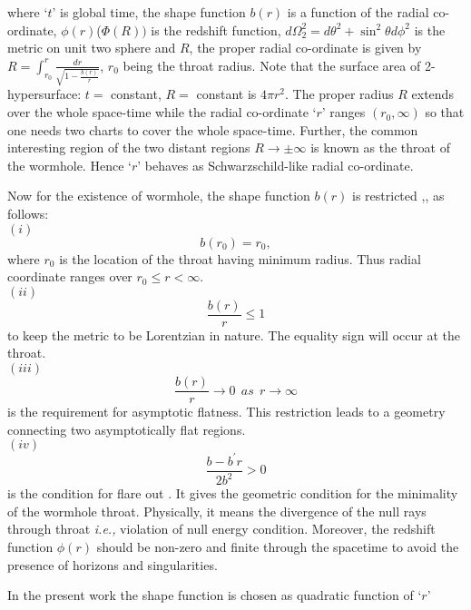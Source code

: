 \documentclass[10pt]{revtex4}
\begin{document}
where `$t$' is global time, the shape function $b(r)$ is a function of the radial co-ordinate, $\phi(r)$($\Phi(R))$ is the redshift function, $d\Omega_2^2=d\theta^2+{\sin^2\theta}d\phi^2$ is the metric on unit two sphere and $R$, the proper radial co-ordinate is given by  $R=\int_{r_0}^{r}\frac{dr}{\sqrt{1-\frac{b(r)}{r}}}$, $r_0$ being the throat radius. Note that the surface area of 2-hypersurface: $t=$ constant, $R=$ constant is $4\pi r^2$. The proper radius $R$ extends over the whole space-time while the radial co-ordinate `$r$' ranges $(r_0, \infty)$ so that one needs two charts to cover the whole space-time. Further, the common interesting region of the two distant regions $R\rightarrow$$\pm\infty$ is known as the throat of the wormhole. Hence `$r$' behaves as Schwarzschild-like radial co-ordinate. 
\par Now for the existence of wormhole, the shape function $b(r)$ is restricted \cite{r1},\cite{r6},\cite{r7} as follows:\\
$	(i)$
\begin{equation}
\label{eq5}
 b(r_0)=r_0,
\end{equation} 
where $r_0$ is the location of the throat having minimum radius. Thus radial coordinate ranges over $r_0\leq r<\infty.$\\
$(ii)$
\begin{equation}\label{eq6}
\frac{b(r)}{r}\leq 1
\end{equation}
to keep the metric to be Lorentzian in nature. The equality sign will occur at the throat.\\
$(iii)$
\begin{equation}\label{eq7}
\frac{b(r)}{r}\rightarrow 0 ~~as~~ r\rightarrow \infty
\end{equation}
is the requirement for asymptotic flatness. This restriction leads to a geometry connecting two asymptotically flat regions.\\
$(iv)$
\begin{equation}\label{eq8}
\frac{b-b^\prime r}{2b^2}>0
\end{equation}
is the condition for flare out \cite{r14.1}. It gives the geometric condition for the minimality of the wormhole throat. Physically, it means the divergence of the null rays through throat{ \it i.e.,} violation of null energy condition. Moreover, the redshift function $\phi(r)$ should be non-zero and finite through the spacetime to avoid the presence of horizons and singularities.\par
In the present work the shape function is chosen as quadratic function of `$r$'
$$
\end{document}
